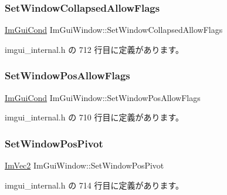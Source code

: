 \subsubsection{\texorpdfstring{Set\+Window\+Collapsed\+Allow\+Flags}{SetWindowCollapsedAllowFlags}}
{\footnotesize\ttfamily \mbox{\hyperlink{imgui_8h_aef890d6ac872e12c5804d0b3e4f7f103}{Im\+Gui\+Cond}} Im\+Gui\+Window\+::\+Set\+Window\+Collapsed\+Allow\+Flags}



 imgui\+\_\+internal.\+h の 712 行目に定義があります。

\mbox{\label{struct_im_gui_window_a8ff69a8bdc9221c9cc7d8ba656013d84}} 
\subsubsection{\texorpdfstring{Set\+Window\+Pos\+Allow\+Flags}{SetWindowPosAllowFlags}}
{\footnotesize\ttfamily \mbox{\hyperlink{imgui_8h_aef890d6ac872e12c5804d0b3e4f7f103}{Im\+Gui\+Cond}} Im\+Gui\+Window\+::\+Set\+Window\+Pos\+Allow\+Flags}



 imgui\+\_\+internal.\+h の 710 行目に定義があります。

\mbox{\label{struct_im_gui_window_a4de5608bf44728447327d832fa84f0c9}} 
\subsubsection{\texorpdfstring{Set\+Window\+Pos\+Pivot}{SetWindowPosPivot}}
{\footnotesize\ttfamily \mbox{\hyperlink{struct_im_vec2}{Im\+Vec2}} Im\+Gui\+Window\+::\+Set\+Window\+Pos\+Pivot}



 imgui\+\_\+internal.\+h の 714 行目に定義があります。

\mbox{\label{struct_im_gui_window_a6caed47ef8e25a2e7a68a6be72c5716a}} 
